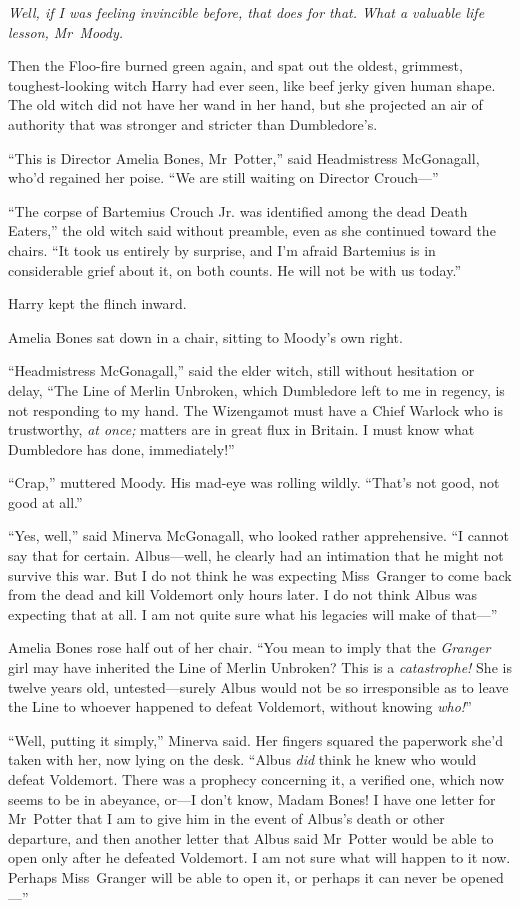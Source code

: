 \emph{Well, if I was feeling invincible before, that does for that. What a valuable life lesson, Mr~Moody.}

Then the Floo-fire burned green again, and spat out the oldest, grimmest, toughest-looking witch Harry had ever seen, like beef jerky given human shape. The old witch did not have her wand in her hand, but she projected an air of authority that was stronger and stricter than Dumbledore’s.

“This is Director Amelia Bones, Mr~Potter,” said Headmistress McGonagall, who’d regained her poise. “We are still waiting on Director Crouch—”

“The corpse of Bartemius Crouch Jr. was identified among the dead Death Eaters,” the old witch said without preamble, even as she continued toward the chairs. “It took us entirely by surprise, and I’m afraid Bartemius is in considerable grief about it, on both counts. He will not be with us today.”

Harry kept the flinch inward.

Amelia Bones sat down in a chair, sitting to Moody’s own right.

“Headmistress McGonagall,” said the elder witch, still without hesitation or delay, “The Line of Merlin Unbroken, which Dumbledore left to me in regency, is not responding to my hand. The Wizengamot must have a Chief Warlock who is trustworthy, \emph{at once;} matters are in great flux in Britain. I must know what Dumbledore has done, immediately!”

“Crap,” muttered Moody. His mad-eye was rolling wildly. “That’s not good, not good at all.”

“Yes, well,” said Minerva McGonagall, who looked rather apprehensive. “I cannot say that for certain. Albus—well, he clearly had an intimation that he might not survive this war. But I do not think he was expecting Miss~Granger to come back from the dead and kill Voldemort only hours later. I do not think Albus was expecting that at all. I am not quite sure what his legacies will make of that—”

Amelia Bones rose half out of her chair. “You mean to imply that the \emph{Granger} girl may have inherited the Line of Merlin Unbroken? This is a \emph{catastrophe!} She is twelve years old, untested—surely Albus would not be so irresponsible as to leave the Line to whoever happened to defeat Voldemort, without knowing \emph{who!}”

“Well, putting it simply,” Minerva said. Her fingers squared the paperwork she’d taken with her, now lying on the desk. “Albus \emph{did} think he knew who would defeat Voldemort. There was a prophecy concerning it, a verified one, which now seems to be in abeyance, or—I don’t know, Madam Bones! I have one letter for Mr~Potter that I am to give him in the event of Albus’s death or other departure, and then another letter that Albus said Mr~Potter would be able to open only after he defeated Voldemort. I am not sure what will happen to it now. Perhaps Miss~Granger will be able to open it, or perhaps it can never be opened—”

